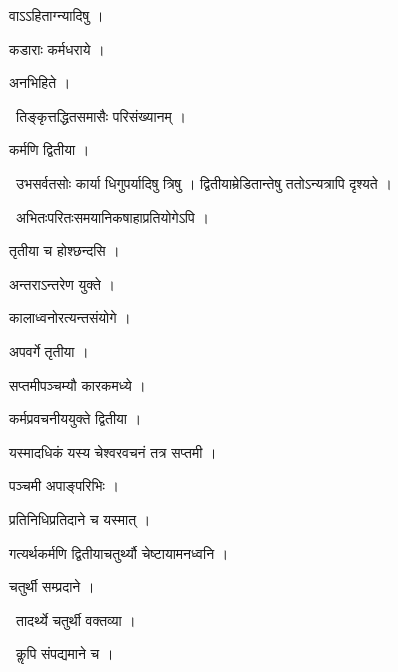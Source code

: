 \documentclass[10pt, openany, oneside]{book}
\begin{document}
\noindent वाऽऽहिताग्न्यादिषु ।

\noindent कडाराः कर्मधराये ।

\noindent अनभिहिते ।

\par\noindent\hspace{1.5em}{\vps वा॰}~{\qt तिङ्कृत्तद्धितसमासैः परिसंख्यानम् ।}

\noindent कर्मणि द्वितीया ।

\par\noindent\hspace{1.5em}{\vps वा॰}~{\qt उभसर्वतसोः कार्या धिगुपर्यादिषु त्रिषु । द्वितीयाम्रेडितान्तेषु ततोऽन्यत्रापि दृश्यते ।}

\par\noindent\hspace{1.5em}{\vps वा॰}~{\qt अभितःपरितःसमयानिकषाहाप्रतियोगेऽपि ।}

\noindent तृतीया च होश्छन्दसि ।

\noindent अन्तराऽन्तरेण युक्ते ।

\noindent कालाध्वनोरत्यन्तसंयोगे ।

\noindent अपवर्गे तृतीया ।

\noindent सप्तमीपञ्चम्यौ कारकमध्ये ।

\noindent कर्मप्रवचनीययुक्ते द्वितीया ।

\noindent यस्मादधिकं यस्य चेश्वरवचनं तत्र सप्तमी ।

\noindent पञ्चमी अपाङ्परिभिः ।

\noindent प्रतिनिधिप्रतिदाने च यस्मात् ।

\noindent गत्यर्थकर्मणि द्वितीयाचतुर्थ्यौ चेष्टायामनध्वनि ।

\noindent चतुर्थी सम्प्रदाने ।

\par\noindent\hspace{1.5em}{\vps वा॰}~{\qt तादर्थ्ये चतुर्थी वक्तव्या ।}

\par\noindent\hspace{1.5em}{\vps वा॰}~{\qt कॢपि संपद्यमाने च ।}
\end{document}
